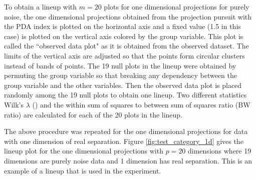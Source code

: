 \documentclass[12]{article}
\begin{document}
To obtain a lineup with $m = 20$ plots for one dimensional projections for purely noise, the one dimensional projections obtained from the projection pursuit with the PDA index is plotted on the horizontal axis and a fixed value (1.5 in this case) is plotted on the vertical axis colored by the group variable. This plot is called the ``observed data plot" as it is obtained from the observed dataset. The limits of the vertical axis are adjusted so that the points form circular clusters instead of bands of points. The 19 null plots in the lineup were obtained by  permuting the group variable so that breaking any dependency between the group variable and the other variables. Then the observed data plot is placed randomly among the 19 null plots to obtain one lineup. Two different statistics Wilk's $\lambda$ (\cite{JW02})  and the within sum of squares to between sum of squares ratio (BW ratio) are calculated for each of the 20 plots in the lineup. 

The above procedure was repeated for the one dimensional projections for data with one dimension of real separation. Figure \ref{fig:test_category_1d} gives the lineup plot for the one dimensional projections with $p = 20$ dimensions where 19 dimensions are purely noise data and 1 dimension has real separation. This is an example of a lineup that is used in the experiment. 

\end{document}
